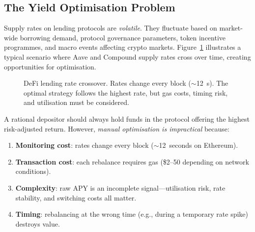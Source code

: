 \documentclass[12pt]{article}
\begin{document}
\subsection{The Yield Optimisation Problem}

Supply rates on lending protocols are \emph{volatile}.
They fluctuate based on market-wide borrowing demand, protocol governance parameters, token incentive programmes, and macro events affecting crypto markets.
Figure~\ref{fig:rate-crossover} illustrates a typical scenario where Aave and Compound supply rates cross over time, creating opportunities for optimisation.

\begin{figure}[H]
\centering
{}
\caption{DeFi lending rate crossover.  Rates change every block ($\sim$12~s).
The optimal strategy follows the highest rate, but gas costs, timing risk, and utilisation must be considered.}
\label{fig:rate-crossover}
\end{figure}

A rational depositor should always hold funds in the protocol offering the highest risk-adjusted return.
However, \emph{manual optimisation is impractical} because:
\begin{enumerate}[nosep]
  \item \textbf{Monitoring cost}: rates change every block ($\sim$12~seconds on Ethereum).
  \item \textbf{Transaction cost}: each rebalance requires gas (\$2--50 depending on network conditions).
  \item \textbf{Complexity}: raw APY is an incomplete signal---utilisation risk, rate stability, and switching costs all matter.
  \item \textbf{Timing}: rebalancing at the wrong time (e.g., during a temporary rate spike) destroys value.
\end{enumerate}
\end{document}
